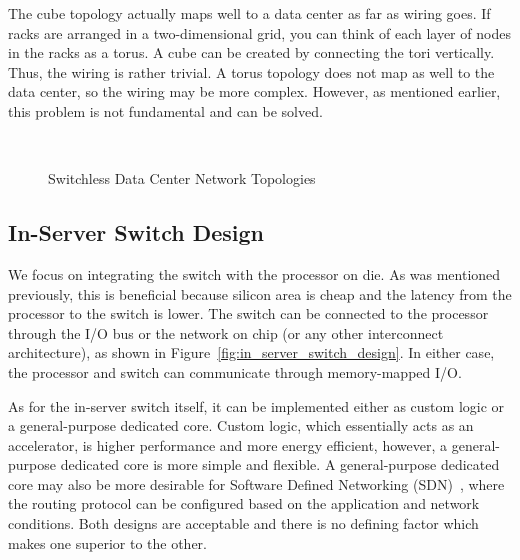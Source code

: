 The cube topology actually maps well to a data center as far as wiring goes.  If racks are arranged in a two-dimensional grid, you can think of each layer of nodes in the racks as a torus.  A cube can be created by connecting the tori vertically.  Thus, the wiring is rather trivial.  A torus topology does not map as well to the data center, so the wiring may be more complex.  However, as mentioned earlier, this problem is not fundamental and can be solved.

\begin{figure}
    \centering
    \\
    \vspace{-0.05in}
    \vspace{-0.07in}
    \caption{Switchless Data Center Network Topologies}
    \label{fig:switchless_topos}
\end{figure}

\subsection{In-Server Switch Design}

We focus on integrating the switch with the processor on die.  As was mentioned previously, this is beneficial because silicon area is cheap and the latency from the processor to the switch is lower.  The switch can be connected to the processor through the I/O bus or the network on chip (or any other interconnect architecture), as shown in Figure~\ref{fig:in_server_switch_design}.  In either case, the processor and switch can communicate through memory-mapped I/O.  

As for the in-server switch itself, it can be implemented either as custom logic or a general-purpose dedicated core.  Custom logic, which essentially acts as an accelerator, is higher performance and more energy efficient, however, a general-purpose dedicated core is more simple and flexible.  A general-purpose dedicated core may also be more desirable for Software Defined Networking (SDN)~\cite{Kim:2013:INMSDN,Staessens:2011:SDNMCGR,Goth:2011:SDNCSUMP}, where the routing protocol can be configured based on the application and network conditions.  Both designs are acceptable and there is no defining factor which makes one superior to the other.

